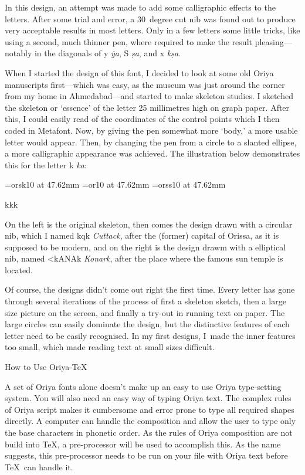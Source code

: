 In this design, an attempt was made to add some calligraphic effects
to the letters. After some trial and error, a 30~degree cut nib was found
out to produce very acceptable results in most letters. Only in a few
letters some little tricks, like using a second, much thinner pen, where
required to make the result pleasing---notably in the diagonals
of {\or y} {\it \.ya}, {\or S} {\it \d{s}a}, and {\or x} {\it k\d{s}a}.

When I started the design of this font, I decided to look at some old Oriya
manuscripts first---which was easy, as the museum was just around the corner
from my home in Ahmedabad---and started to make skeleton studies. I sketched the
skeleton or `essence' of the letter 25 millimetres high on graph paper.
After this, I could easily read of the coordinates of the control points which
I then coded in Metafont. Now, by giving the pen somewhat more `body,' a more
usable letter would appear. Then, by changing the pen from a circle to a slanted 
ellipse, a more calligraphic appearance was achieved. The illustration
below demonstrates this for the letter {\or k} {\it ka\/}:


\font\orskBIG=orsk10 at 47.62mm
\font\orBIG=or10 at 47.62mm
\font\orssBIG=orss10 at 47.62mm
\vskip1cm
\centerline{\orskBIG k\quad\orssBIG k\quad\orBIG k}
\vskip1cm


On the left is the original skeleton, then comes the design drawn with
a circular nib, which I named {\orss kqk} {\it Cuttack}, after the (former) capital
of Orissa, as it is supposed to be modern, and on the right is the design drawm
with a elliptical nib, named {\or <kANAk\orreph} {\it Konark}, after the place
where the famous sun temple is located.

Of course, the designs didn't come out right the first time. Every letter
has gone through several iterations of the process of first a skeleton
sketch, then a large size picture on the screen, and finally a try-out
in running text on paper. The large circles can easily dominate the design, but the
distinctive
features of each letter need to be easily recognised. In my first designs, I~made
the inner features too small, which made reading text at small sizes difficult.

\beginsection How to Use Oriya-\TeX

A set of Oriya fonts alone doesn't make up an easy to use Oriya type-setting system.
You will also need an easy way of typing Oriya text. The complex
rules of Oriya script makes it cumbersome and error prone to type all
required shapes directly. A computer can handle the composition and allow
the user to type only the base characters in phonetic order. As the rules of
Oriya composition are not build into \TeX, a pre-processor will be used to accomplish
this. As the name suggests, this pre-processor needs to be run on your file
with Oriya text before \TeX\ can handle it.


